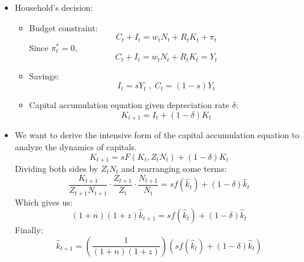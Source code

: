 \documentclass[notitlepage]{article}
\begin{document}
\begin{itemize}
\begin{itemize}
\[
R_t = \alpha \hat{k}_t^{\alpha-1}
\]
\[
w_t = Z_t (1-\alpha) \hat{k}_t^{\alpha}
\]
\[
\frac{w_tN_t}{Y_t} = 1 - \alpha
\]
\item We will show later that $\hat{k}_t$ is constant over time, so these three equations are consistent with Facts (5), (6), and (4) respectively.
\end{itemize}

\item Household's decision:
\begin{itemize}
\item Budget constraint:
\[
C_t + I_t = w_tN_t + R_tK_t + \pi_t
\]
Since $\pi^*_t = 0$,
\[
C_t + I_t = w_tN_t + R_tK_t = Y_t
\]
\item Savings:
\[
I_t = sY_t \;,\; C_t = (1-s)Y_t
\]
\item Capital accumulation equation given depreciation rate \(\delta\):
\[
K_{t+1} = I_t + (1-\delta)K_t
\]
\end{itemize}

\item We want to derive the intensive form of the capital accumulation equation to analyze the dynamics of capitals.
\[
K_{t+1} = sF(K_t, Z_tN_t) + (1-\delta)K_t
\]
Dividing both sides by $Z_tN_t$ and rearranging some terms:
\[
\frac{K_{t+1}}{Z_{t+1}N_{t+1}}\cdot\frac{Z_{t+1}}{Z_t}\cdot\frac{N_{t+1}}{N_t} = sf(\hat{k}_t) + (1-\delta)\hat{k}_t
\]
Which gives us:
\[
(1+n)(1+z)\hat{k}_{t+1} = sf(\hat{k}_t) + (1-\delta)\hat{k}_t
\]
Finally:
\[
\hat{k}_{t+1} = \left(\frac{1}{(1+n)(1+z)}\right)(sf(\hat{k}_t) + (1-\delta)\hat{k}_t)
\]


\end{itemize}
\end{document}
